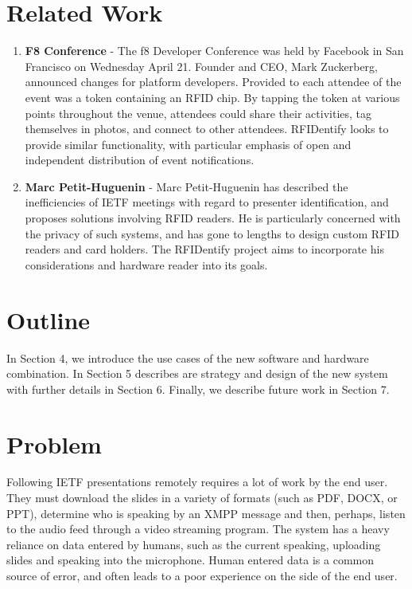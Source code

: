\documentclass{article}
\begin{document}
\section{Related Work}
	
	\begin{enumerate}
	\item \textbf{F8 Conference} - 
          The f8 Developer Conference was held by Facebook in San Francisco on Wednesday April 21. 
          Founder and CEO, Mark Zuckerberg, announced changes for platform developers. 
          Provided to each attendee of the event was a token containing an RFID chip.  
          By tapping the token at various points throughout the venue, attendees could share
          their activities, tag themselves in photos, and connect to other attendees.
          RFIDentify looks to provide similar functionality, with particular emphasis of
          open and independent distribution of event notifications.

	\item \textbf{ Marc Petit-Huguenin} - 
	  Marc Petit-Huguenin has described the inefficiencies of IETF meetings with regard
          to presenter identification, and proposes solutions involving RFID readers. He is
          particularly concerned with the privacy of such systems, and has gone to lengths
          to design custom RFID readers and card holders. The RFIDentify project aims to 
          incorporate his considerations and hardware reader into its goals.
        \end{enumerate}
        
\section{Outline}
	  In Section 4, we introduce the use cases of the new software and hardware combination. 
          In Section 5 describes are strategy and design of the new system with further details in Section 6. 
          Finally, we describe future work in Section 7.

\section{Problem}
          Following IETF presentations remotely requires a lot of work by the end user. 
          They must download the slides in a variety of formats (such as PDF, DOCX, or PPT), 
          determine who is speaking by an XMPP message and then, perhaps, listen to the audio feed 
          through a video streaming program. 
          The system has a heavy reliance on data entered by humans, such as the current speaking, 
          uploading slides and speaking into the microphone. 
          Human entered data is a common source of error, and often leads to a poor experience on the side of the end user.
\end{document}
